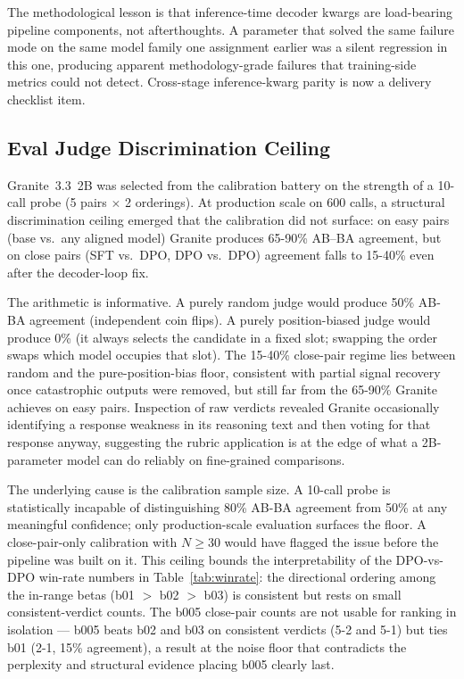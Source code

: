 \documentclass[../main.tex]{subfiles}
\begin{document}
The methodological lesson is that inference-time decoder kwargs are load-bearing pipeline components, not afterthoughts. A parameter that solved the same failure mode on the same model family one assignment earlier was a silent regression in this one, producing apparent methodology-grade failures that training-side metrics could not detect. Cross-stage inference-kwarg parity is now a delivery checklist item.

\subsection{Eval Judge Discrimination Ceiling}
\label{sec:judge_ceiling}

Granite~3.3~2B was selected from the calibration battery on the strength of a 10-call probe (5 pairs $\times$ 2 orderings). At production scale on 600 calls, a structural discrimination ceiling emerged that the calibration did not surface: on easy pairs (base vs.\ any aligned model) Granite produces 65-90\% AB--BA agreement, but on close pairs (SFT vs.\ DPO, DPO vs.\ DPO) agreement falls to 15-40\% even after the decoder-loop fix.

The arithmetic is informative. A purely random judge would produce 50\% AB-BA agreement (independent coin flips). A purely position-biased judge would produce 0\% (it always selects the candidate in a fixed slot; swapping the order swaps which model occupies that slot). The 15-40\% close-pair regime lies between random and the pure-position-bias floor, consistent with partial signal recovery once catastrophic outputs were removed, but still far from the 65-90\% Granite achieves on easy pairs. Inspection of raw verdicts revealed Granite occasionally identifying a response weakness in its reasoning text and then voting for that response anyway, suggesting the rubric application is at the edge of what a 2B-parameter model can do reliably on fine-grained comparisons.

The underlying cause is the calibration sample size. A 10-call probe is statistically incapable of distinguishing 80\% AB-BA agreement from 50\% at any meaningful confidence; only production-scale evaluation surfaces the floor. A close-pair-only calibration with $N \geq 30$ would have flagged the issue before the pipeline was built on it. This ceiling bounds the interpretability of the DPO-vs-DPO win-rate numbers in Table~\ref{tab:winrate}: the directional ordering among the in-range betas (b01 $>$ b02 $>$ b03) is consistent but rests on small consistent-verdict counts. The b005 close-pair counts are not usable for ranking in isolation --- b005 beats b02 and b03 on consistent verdicts (5-2 and 5-1) but ties b01 (2-1, 15\% agreement), a result at the noise floor that contradicts the perplexity and structural evidence placing b005 clearly last.
\end{document}
